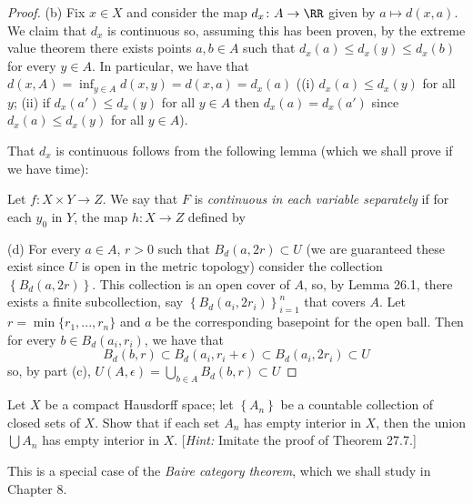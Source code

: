 \begin{proof}
(b) Fix $x\in X$ and consider the map $d_x\colon A\to\RR$ given by
$a\mapsto d(x,a)$. We claim that $d_x$ is continuous so, assuming this
has been proven, by the extreme value theorem there exists points
$a,b\in A$ such that $d_x(a)\leq d_x(y)\leq d_x(b)$ for every $y\in
A$. In particular, we have that $d(x,A)=\inf_{y\in
  A}d(x,y)=d(x,a)=d_x(a)$ ((i) $d_x(a)\leq d_x(y)$ for all $y$; (ii)
if $d_x(a')\leq d_x(y)$ for all $y\in A$ then $d_x(a)=d_x(a')$ since
$d_x(a)\leq d_x(y)$ for all $y\in A$).

That $d_x$ is continuous follows from the following lemma (which we
shall prove if we have time):
\begin{lemma*}[Munkres \S18, Ex\.,11]
Let $f\colon X\times Y\to Z$. We say that $F$ is \emph{continuous in
  each variable separately} if for each $y_0$ in $Y$, the map $h\colon
X\to Z$ defined by
\end{lemma*}
(d) For every $a\in A$, $r>0$ such that $B_d(a,2r)\subset U$ (we are
guaranteed these exist since $U$ is open in the metric topology)
consider the collection $\left\{B_d(a,2r)\right\}$. This collection is an open
cover of $A$, so, by Lemma 26.1, there exists a finite subcollection,
say $\left\{B_d(a_i,2r_i)\right\}_{i=1}^n$ that covers $A$. Let
$r=\min\{r_1,...,r_n\}$ and $a$ be the corresponding basepoint for the
open ball. Then for every $b\in B_d(a_i,r_i)$, we have that
\[B_d(b,r)\subset B_d(a_i,r_i+\epsilon)\subset B_d(a_i,2r_i)\subset U\]
so, by part (c), $U(A,\epsilon)=\bigcup_{b\in A}B_d(b,r)\subset U$
\end{proof}
\newpage
\begin{problem}[Munkres \S27, Ex.\,5]
Let $X$ be a compact Hausdorff space; let $\left\{A_n\right\}$ be
a countable collection of closed sets of $X$. Show that if each
set $A_n$ has empty interior in $X$, then the union $\bigcup A_n$
has empty interior in $X$. [\emph{Hint:} Imitate the proof of
Theorem 27.7.]

This is a special case of the \emph{Baire category theorem},
which we shall study in Chapter 8.
\end{problem}
